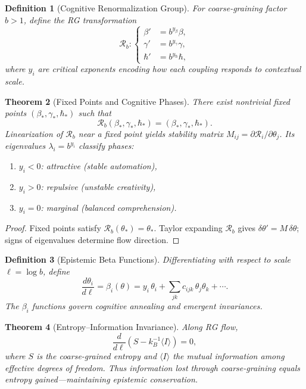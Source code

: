 \documentclass[12pt,a4paper,twoside,openright]{book}
\newtheorem{theorem}{Theorem}
\newtheorem{definition}[theorem]{Definition}
\begin{document}
\begin{definition}[Cognitive Renormalization Group]
For coarse-graining factor \(b>1\), define the RG transformation
\[
\mathcal{R}_b:
\begin{cases}
\beta' &= b^{y_\beta}\beta,\\
\gamma' &= b^{y_\gamma}\gamma,\\
\hbar' &= b^{y_\hbar}\hbar,
\end{cases}
\]
where \(y_i\) are critical exponents encoding how each coupling responds to contextual scale.
\end{definition}

\begin{theorem}[Fixed Points and Cognitive Phases]
\label{thm:rgfixed}
There exist nontrivial fixed points \((\beta_*,\gamma_*,\hbar_*)\) such that
\[
\mathcal{R}_b(\beta_*,\gamma_*,\hbar_*)=(\beta_*,\gamma_*,\hbar_*).
\]
Linearization of $\mathcal{R}_b$ near a fixed point yields stability matrix \(M_{ij}=\partial \mathcal{R}_i/\partial \theta_j\).
Its eigenvalues $\lambda_i=b^{y_i}$ classify phases:
\begin{enumerate}
\item $y_i<0$: attractive (stable automation),
\item $y_i>0$: repulsive (unstable creativity),
\item $y_i=0$: marginal (balanced comprehension).
\end{enumerate}
\end{theorem}

\begin{proof}
Fixed points satisfy $\mathcal{R}_b(\theta_*)=\theta_*$.  
Taylor expanding $\mathcal{R}_b$ gives $\delta\theta' = M\,\delta\theta$;  
signs of eigenvalues determine flow direction.
\end{proof}

\begin{definition}[Epistemic Beta Functions]
Differentiating with respect to scale $\ell=\log b$, define
\[
\frac{d\theta_i}{d\ell} = \beta_i(\theta)
  = y_i\,\theta_i + \sum_{jk} c_{ijk}\,\theta_j\theta_k + \cdots.
\]
The $\beta_i$ functions govern cognitive annealing and emergent invariances.
\end{definition}

\begin{theorem}[Entropy–Information Invariance]
\label{thm:entropyinvariance}
Along RG flow,
\[
\frac{d}{d\ell}(S - k_B^{-1}\langle I\rangle) = 0,
\]
where \(S\) is the coarse-grained entropy and \(\langle I\rangle\) the mutual information among effective degrees of freedom.  
Thus information lost through coarse-graining equals entropy gained—maintaining epistemic conservation.
\end{theorem}
\end{document}
